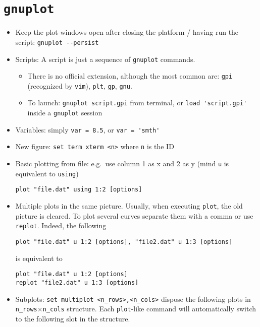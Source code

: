 \documentclass[a4paper,12pt,%
              final%
              ]{article}
\begin{document}
\section{\texttt{gnuplot}}
\begin{itemize}
  \item Keep the plot-windows open after closing the platform / having run the script: \verb|gnuplot --persist|
  \item Scripts: A script is just a sequence of \texttt{gnuplot} commands.
    \begin{itemize}
      \item There is no official extension, although the most common are: \texttt{gpi} (recognized by \texttt{vim}), \texttt{plt}, \texttt{gp}, \texttt{gnu}.
      \item To launch: \verb|gnuplot script.gpi| from terminal, or \verb|load 'script.gpi'| inside a \verb|gnuplot| session
    \end{itemize}
  \item Variables: simply \verb|var = 8.5|, or \verb|var = 'smth'|
  \item New figure: \verb|set term xterm <n>| where \verb|n| is the ID
  \item Basic plotting from file: e.g.~use column 1 as x and 2 as y (mind \texttt{u} is equivalent to \texttt{using})
\begin{verbatim}
plot "file.dat" using 1:2 [options]
\end{verbatim}
  \item Multiple plots in the same picture. Usually, when executing \texttt{plot}, the old picture is cleared. To plot several curves separate them with a comma or use \verb|replot|. Indeed, the following
\begin{verbatim}
plot "file.dat" u 1:2 [options], "file2.dat" u 1:3 [options]
\end{verbatim}
    is equivalent to
\begin{verbatim}
plot "file.dat" u 1:2 [options]
replot "file2.dat" u 1:3 [options]
\end{verbatim}
  \item Subplots: \verb|set multiplot <n_rows>,<n_cols>| dispose the following plots in \verb|n_rows|$\times$\verb|n_cols| structure. Each \verb|plot|-like command will automatically switch to the following slot in the structure.

\end{itemize}
\end{document}
